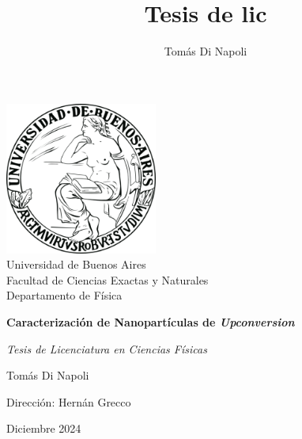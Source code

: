 \documentclass[12pt]{report}
\title{Tesis de lic}
\author{Tomás Di Napoli}
\begin{document}

\thispagestyle{empty}
\begin{center}

{\includegraphics[width=5cm]{UBA_logo.png}\\}
\vspace*{2mm}
{\large Universidad de Buenos Aires\\}
{\large Facultad de Ciencias Exactas y Naturales\\}
{\large Departamento de Física\\}


\vspace*{2cm}
{\huge \bf Caracterización de Nanopartículas de \textit{Upconversion}}


\vspace*{1cm}
{\it {\large Tesis de Licenciatura en Ciencias Físicas} 
}

\vspace*{0.8cm}


\vspace*{6mm}
{\Large Tomás Di Napoli \\}

\vspace*{10mm}
{\large Dirección: Hernán Grecco\\}
\vspace*{5mm}

\vspace*{5mm}
{\large Diciembre 2024\\}
\end{center}
\end{document}
